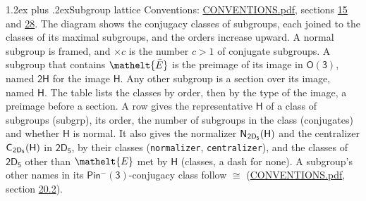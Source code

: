 \documentclass[10pt,a4paper]{article}
\makeatletter
\renewcommand\section{\@startsection{section}{1}{\z@}{-3ex plus -1ex minus -.2ex}%
  {1.2ex plus .2ex}{\normalfont\large\sffamily\bfseries\color{parttitle}}}
\numberwithin{equation}{section}
\newcommand{\eltfont}[1]{{\let\sigma\eltsigma\mathelt{#1}}}
\newcommand{\grp}[1]{\mathsf{#1}}
\newcommand{\cls}[1]{\eltfont{#1}}
\newcommand{\elt}[1]{\eltfont{#1}}
\newcommand{\samecls}{\cong}
\newcommand{\nconj}[1]{{\scriptsize$\times#1$}}
\newcommand{\barred}[1]{\bar{#1}}
\newcommand{\hairsp}{\mkern1mu}
\makeatother
\begin{document}
\section{Subgroup lattice}\label{s:subgroups}
Conventions: \href{../../CONVENTIONS.pdf}{CONVENTIONS.pdf}, sections \href{../../../rotation/CONVENTIONS.pdf\#conv.15}{15} and \href{../../CONVENTIONS.pdf\#conv.28}{28}.
The diagram shows the conjugacy classes of subgroups, each joined to the classes of its maximal subgroups, and the orders increase upward. A normal subgroup is framed, and ${\times}c$ is the number $c > 1$ of conjugate subgroups. \label{n:group.H}A subgroup that contains $\elt{\barred{E}}$ is the preimage of its image in $\grp{O(3)}$, named $\grp{2H}$ for the image $\grp{H}$. Any other subgroup is a section over its image, named $\grp{H}$. The table lists the classes by order, then by the type of the image, a preimage before a section. \label{n:head.subgroup}\label{n:head.order}\label{n:head.conjugates}\label{n:head.normal}A row gives the representative $\grp{H}$ of a class of subgroups (subgrp), its order, the number of subgroups in the class (conjugates) and whether $\grp{H}$ is normal. \label{n:group.normalizer}\label{n:group.centralizer}\label{n:head.classes}It also gives the normalizer $\grp{N}_{\hairsp \grp{2D_{5}}}(\grp{H})$ and the centralizer $\grp{C}_{\hairsp \grp{2D_{5}}}(\grp{H})$ in $\grp{2D_{5}}$, by their classes (\texttt{normalizer}, \texttt{centralizer}), and the classes of $\grp{2D_{5}}$ other than $\cls{E}$ met by $\grp{H}$ (classes, a dash for none). A subgroup's other names in its \href{Pinminus3.pdf}{$\grp{Pin^{-}(3)}$}-conjugacy class follow $\samecls$ (\href{../../CONVENTIONS.pdf}{CONVENTIONS.pdf}, section \href{../../CONVENTIONS.pdf\#conv.20.2}{20.2}).
\begin{center}
\end{center}
\end{document}

